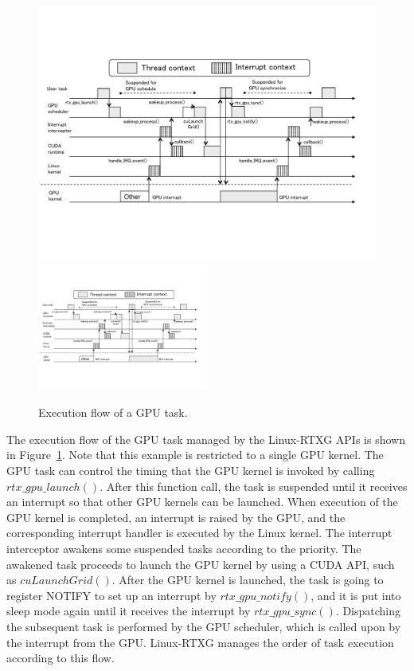 \begin{figure}[!t]
\begin{center}
 \ifthesis
 \includegraphics[width=\textwidth]{img/temp3.pdf}
 \else
 \includegraphics[width=0.5\textwidth]{img/temp3.pdf}
 \fi
\caption{Execution flow of a GPU task.}
\vspace{-4mm}
\label{fig:controlflow}
\end{center}
\end{figure}

The execution flow of the GPU task managed by the Linux-RTXG APIs is shown in Figure~\ref{fig:controlflow}.
Note that this example is restricted to a single GPU kernel.
The GPU task can control the timing that the GPU kernel is invoked by calling $rtx\_gpu\_launch()$.
After this function call, the task is suspended until it receives an interrupt so that other GPU kernels can be launched.
When execution of the GPU kernel is completed, an interrupt is raised by the GPU, and the corresponding interrupt handler is executed by the Linux kernel.
The interrupt interceptor awakens some suspended tasks according to the priority.
The awakened task proceeds to launch the GPU kernel by using a CUDA API, such as $cuLaunchGrid()$.
After the GPU kernel is launched, the task is going to register NOTIFY to set up an interrupt by $rtx\_gpu\_notify()$, and it is put into sleep mode again until it receives the interrupt by $rtx\_gpu\_sync()$.
Dispatching the subsequent task is performed by the GPU scheduler, which is called upon by the interrupt from the GPU.
Linux-RTXG manages the order of task execution according to this flow.


